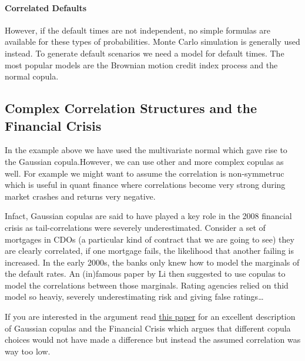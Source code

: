     \hypertarget{correlated-defaults}{%
\paragraph{Correlated Defaults}\label{correlated-defaults}}

However, if the default times are not independent, no simple formulas
are available for these types of probabilities. Monte Carlo simulation
is generally used instead. To generate default scenarios we need a model
for default times. The most popular models are the Brownian motion
credit index process and the normal copula.

    \hypertarget{complex-correlation-structures-and-the-financial-crisis}{%
\subsection{Complex Correlation Structures and the Financial
Crisis}\label{complex-correlation-structures-and-the-financial-crisis}}

In the example above we have used the multivariate normal which gave
rise to the Gaussian copula.However, we can use other and more complex
copulas as well. For example we might want to assume the correlation is
non-symmetruc which is useful in quant finance where correlations become
very strong during market crashes and returns very negative.

Infact, Gaussian copulas are said to have played a key role in the 2008
financial crisis as tail-correlations were severely underestimated.
Consider a set of mortgages in CDOs (a particular kind of contract that
we are going to see) they are clearly correlated, if one mortgage fails,
the likelihood that another failing is increased. In the early 2000s,
the banks only knew how to model the marginals of the default rates. An
(in)famous paper by Li then suggested to use copulas to model the
correlations between those marginals. Rating agencies relied on thid
model so heaviy, severely underestimating risk and giving false
ratings\ldots{}

If you are interested in the argument read
\href{http://timmurphy.org/2009/07/22/line-spacing-in-latex-documents/}{this paper}
for an excellent description of Gaussian copulas and the Financial
Crisis which argues that different copula choices would not have made a
difference but instead the assumed correlation was way too low.


    
    
    

